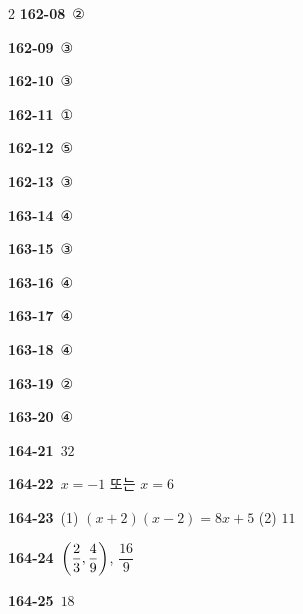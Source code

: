 \documentclass[10pt,a4paper]{article}
\begin{document}
\begin{multicols}{2}
\noindent\textbf{162-08}\ ②\par
\noindent\textbf{162-09}\ ③\par
\noindent\textbf{162-10}\ ③\par
\noindent\textbf{162-11}\ ①\par
\noindent\textbf{162-12}\ ⑤\par
\noindent\textbf{162-13}\ ③\par
\noindent\textbf{163-14}\ ④\par
\noindent\textbf{163-15}\ ③\par
\noindent\textbf{163-16}\ ④\par
\noindent\textbf{163-17}\ ④\par
\noindent\textbf{163-18}\ ④\par
\noindent\textbf{163-19}\ ②\par
\noindent\textbf{163-20}\ ④\par
\noindent\textbf{164-21}\ $32$\par
\noindent\textbf{164-22}\ $x=-1$ 또는 $x=6$\par
\noindent\textbf{164-23}\ (1) $(x+2)(x-2)=8x+5$ (2) $11$\par
\noindent\textbf{164-24}\ $\left(\dfrac{2}{3}{,}\mkern3mu \dfrac{4}{9}\right)$, $\dfrac{16}{9}$\par
\noindent\textbf{164-25}\ $18$\par
\end{multicols}
\end{document}
